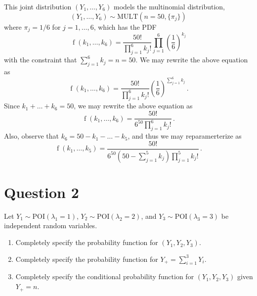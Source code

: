 \documentclass[12pt]{fphw}[final]
\begin{document}
\begin{enumerate}
    This joint distribution $(Y_1,\ldots,Y_6)$ models the multinomial distribution,
	\begin{equation}
		(Y_1,\ldots,Y_6) \sim \mathrm{MULT}(n=50,\{\pi_j\})
	\end{equation}
    where $\pi_j = 1/6$ for $j=1,\ldots,6$, which has the PDF
	\begin{equation}
		\operatorname{f}(k_1,\ldots,k_6) = \frac{50!}{\prod_{j=1}^6 k_j!} \prod_{j=1}^{6} \left(\frac{1}{6}\right)^{k_j}
	\end{equation}
	with the constraint that $\sum_{j=1}^{6} k_j = n = 50$. We may rewrite the above equation as
	\begin{equation}
		\operatorname{f}(k_1,\ldots,k_6) = \frac{50!}{\prod_{j=1}^6 k_j!} \left(\frac{1}{6}\right)^{\sum_{j=1}^{6} k_j}\,.
	\end{equation}	
	Since $k_1+\ldots+k_6 = 50$, we may rewrite the above equation as
	\begin{equation}
		\operatorname{f}(k_1,\ldots,k_6) = \frac{50!}{6^{50} \prod_{j=1}^6 k_j!}\,.
	\end{equation}
	Also, observe that $k_6 = 50 - k_1 - \ldots - k_5$, and thus we may reparamerterize as
	\begin{equation}
		\operatorname{f}(k_1,\ldots,k_5) = \frac{50!}{6^{50} (50 - \sum_{j=1}^5 k_j)\prod_{j=1}^5 k_j!}\,.
	\end{equation}
\end{enumerate}

\section*{Question 2}
\begin{problem}
Let $Y_1 \sim \mathrm{POI}(\lambda_1=1)$, $Y_2 \sim \mathrm{POI}(\lambda_2=2)$, and $Y_3 \sim \mathrm{POI}(\lambda_3=3)$ be independent random variables.
	
\medskip
\begin{enumerate}
\item Completely specify the probability function for $(Y_1, Y_2, Y_3)$.
\item Completely specify the probability function for $Y_{+} = \sum_{i=1}^{3} Y_i$.
\item Completely specify the conditional probability function for $(Y_1,Y_2,Y_3)$ given $Y_{+} = n$.
\end{enumerate}
\end{problem}
	
\end{document}

